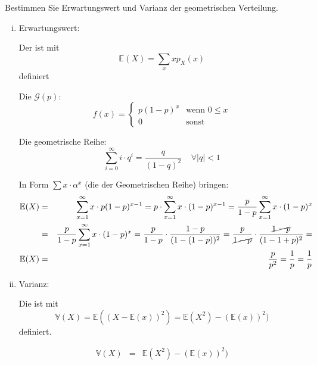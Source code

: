 \begin{uebsp}
\begin{Exercise}[label=ex:3.4]
Bestimmen Sie Erwartungswert und Varianz der geometrischen Verteilung.
\end{Exercise}
\begin{Answer}
    \begin{enumerate}[i)]
        \item Erwartungswert:
            \begin{uebsp_theory}
                Der  ist mit 
                    \[\mathbb E(X)=\sum_x xp_X(x)\]
                definiert
            \end{uebsp_theory}
            \begin{uebsp_theory}
                Die  $\mathcal G(p)$: 
                    \[f(x) = \begin{cases} 
                                p(1-p)^x &\mbox{wenn } 0\leq x \\
                                0 & \mbox{sonst}
                \end{cases}\]
            \end{uebsp_theory}
            \begin{uebsp_theory}
                Die geometrische Reihe:
                \[\sum_{i=0}^\infty i\cdot q^i=\frac{q}{(1-q)^2}\;\;\;\;\forall |q|<1\]
            \end{uebsp_theory}
            In Form $\sum x\cdot \alpha^x$ (die der Geometrischen Reihe) bringen:\\
            \begin{eqnarray*}
                \mathbb{E}(X) &=& \sum_{x=1}^{\infty}x\cdot p(1-p)^{x-1}=p\cdot \sum_{x=1}^{\infty}x\cdot (1-p)^{x-1}=\frac{p}{1-p}\sum_{x=1}^{\infty}x\cdot (1-p)^x \\
                 &=& \frac{p}{1-p}\sum_{x=1}^{\infty}x\cdot (1-p)^x = \frac{p}{1-p}\cdot\frac{1-p}{(1-(1-p))^2}=\frac{p}{\cancel{1-p}}\cdot\frac{\cancel{1-p}}{(1-1+p)^2}=\\
                \mathbb{E}(X) &=&\frac{p}{p^2}=\frac{1}{p} = \frac{1}{p}
            \end{eqnarray*}
        \item Varianz:
            \begin{uebsp_theory}
                Die  ist mit 
                \[\mathbb V(X)=\mathbb E((X-\mathbb E(x))^2)=\mathbb E(X^2)-(\mathbb E(x))^2)\]
                definiert.
            \end{uebsp_theory}
            \begin{eqnarray*}
                \mathbb V(X)&=&\mathbb E(X^2)-(\mathbb E(x))^2)
            \end{eqnarray*}


\end{enumerate}
\end{Answer}
\end{uebsp}

